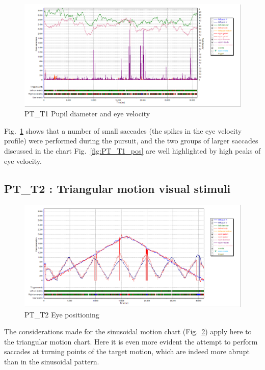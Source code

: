 \begin{figure}[t]
  \centering
  \includegraphics[width=.8\textwidth]{figures/graphs/PT_T1(sinusoid)_VP.png}
  \caption[PT\_T1 pupil velocity]{PT\_T1 Pupil diameter and eye velocity}
  \label{fig:PT_T1_vel}
\end{figure}

Fig.~\ref{fig:PT_T1_vel} shows that a number of small saccades (the spikes in the eye velocity profile) were performed during the pursuit, and the two groups of larger saccades discussed in the chart Fig.~\ref{fig:PT_T1_pos} are well highlighted by high peaks of eye velocity.



\subsection{PT\_T2 : Triangular motion visual stimuli}
\label{sec:PT_T2}

\begin{figure}[h]
  \centering
  \includegraphics[width=.8\textwidth]{figures/graphs/PT_T2(triangular)_XY.png}
  \caption[PT\_T2 Eye positioning]{PT\_T2 Eye positioning}
  \label{fig:PT_T2_pos}
\end{figure}

The considerations made for the sinusoidal motion chart (Fig.~\ref{fig:PT_T2_pos}) apply here to the triangular motion chart. Here it is even more evident the attempt to perform saccades at turning points of the target motion, which are indeed more abrupt than in the sinusoidal pattern.

